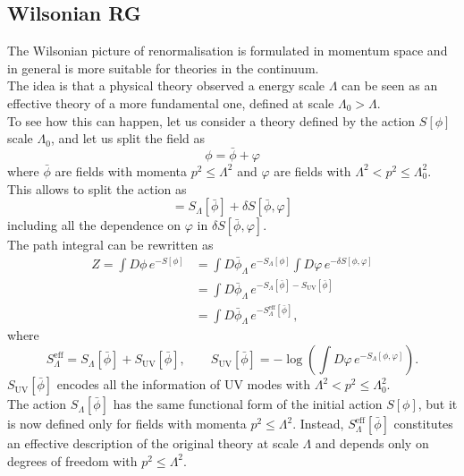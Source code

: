 \subsection{Wilsonian RG}
\label{sec:wilson_rg}
The Wilsonian picture of renormalisation \cite{WilsonRG1,WilsonRG2} is formulated in momentum space and in general is more suitable for theories in the continuum.\\
The idea is that a physical theory observed a energy scale $\Lambda$ can be seen as an effective theory of a more fundamental one, defined at scale $\Lambda_0 > \Lambda$. \\
To see how this can happen, let us consider a theory defined by the action $S[\phi]$ scale $\Lambda_0$, and let us split the field as 
\begin{equation*} 
    \phi = \bar\phi + \varphi
\end{equation*} 
where $\bar\phi$ are fields with momenta $p^2 \leq \Lambda^2$ and $\varphi$ are fields with $\Lambda^2 < p^2 \leq \Lambda_0^{2}$. \\
This allows to split the action as
\begin{equation*} 
    [\bar\phi + \varphi] = S_{\Lambda}[\bar\phi] + \delta S[\bar\phi, \varphi]
\end{equation*}
including all the dependence on $\varphi$ in $\delta S[\bar\phi, \varphi]$. \\
The path integral can be rewritten as
\begin{equation*}
    \begin{aligned}
        Z = \int D\phi \, e^{-S[\phi]} &= \int D\bar\phi_{\Lambda} \, e^{-S_{\Lambda}[\phi]} \int D\varphi  \, e^{-\delta S[\phi, \varphi]}  \\
        &= \int D\bar\phi_{\Lambda} \, e^{-S_{\Lambda}[\bar\phi] - S_\text{UV}[\bar\phi]}\\
        &= \int D\bar\phi_{\Lambda} \, e^{-S_{\Lambda}^\text{eff}[\bar\phi]},
    \end{aligned}
\end{equation*}
where 
\begin{equation*}
    S_{\Lambda}^\text{eff} = S_{\Lambda}[\bar\phi] + S_\text{UV}[\bar\phi], \qquad  S_\text{UV}[\bar\phi] = -\log\left( \int D\varphi \, e^{-S_{\Lambda}[\phi, \varphi]}\right).
\end{equation*}
$ S_\text{UV}[\bar\phi]$ encodes all the information of UV modes with $\Lambda^2 < p^2 \leq \Lambda_0^2$. \\
The action $S_{\Lambda}[\bar\phi]$ has the same functional form of the initial action $S[\phi]$, but it is now defined only for fields with momenta $p^2 \leq \Lambda^{2}$. Instead, $S^\text{eff}_\Lambda[\bar\phi]$ constitutes an effective description of the original theory at scale $\Lambda$ and depends only on degrees of freedom with $p^2 \leq \Lambda^2$. \\
